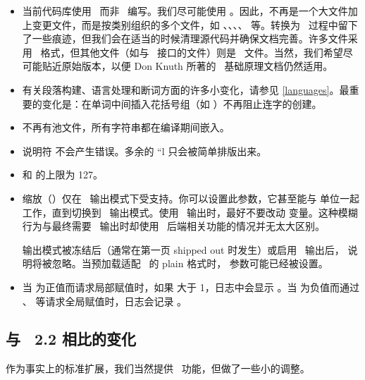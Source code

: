 \begin{itemize}\item 当前代码库使用 \CCODE\ 而非 \PASCAL\ 编写。我们尽可能使用 \CWEB。因此，不再是一个大文件加上变更文件，而是按类别组织的多个文件，如 、、、、 等。转换为 \CCODE\ 过程中留下了一些痕迹，但我们会在适当的时候清理源代码并确保文档完善。许多文件采用 \CWEB\ 格式，但其他文件（如与 \LUA\ 接口的文件）则是 \CCODE\ 文件。当然，我们希望尽可能贴近原始版本，以便 Don Knuth 所著的 \TEX\ 基础原理文档仍然适用。

\item 有关段落构建、语言处理和断词方面的许多小变化，请参见 \ref{languages}。最重要的变化是：在单词中间插入花括号组（如 ）不再阻止连字的创建。

\item 不再有池文件，所有字符串都在编译期间嵌入。

\item 说明符  不会产生错误。多余的 ``l 只会被简单排版出来。

\item {} 和  的上限为 127。

\item 缩放（）仅在 \DVI\ 输出模式下受支持。你可以设置此参数，它甚至能与  单位一起工作，直到切换到 \PDF\ 输出模式。使用 \PDF\ 输出时，最好不要改动  变量。这种模糊行为与最终需要 \DVI\ 输出时却使用 \PDF\ 后端相关功能的情况并无太大区别。

    输出模式被冻结后（通常在第一页 shipped out 时发生）或启用 \PDF\ 输出后， 说明将被忽略。当预加载适配 \LUATEX\ 的 plain 格式时， 参数可能已经被设置。

\item 当 \type {\globaldefs} 为正值而请求局部赋值时，如果 \type {\tracingcommands} 大于 1，日志中会显示 。当 \type {\globaldefs} 为负值而通过 \type {\global}、\type {\gdef} 等请求全局赋值时，日志会记录 。

\end{itemize}

\subsection{与 \ETEX\ 2.2 相比的变化}

\topicindex {\ETEX}

作为事实上的标准扩展，我们当然提供 \ETEX\ 功能，但做了一些小的调整。


